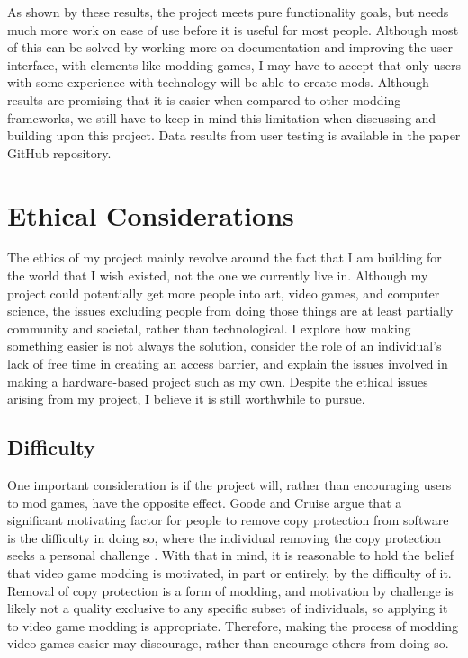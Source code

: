 \documentclass[10pt,twocolumn]{article}
\begin{document}
As shown by these results, the project meets pure functionality goals, but
needs much more work on ease of use before it is useful for most people.
Although most of this can be solved by working more on documentation and
improving the user interface, with elements like modding games, I may have
to accept that only users with some experience with technology will be able
to create mods. Although results are promising that it is easier when compared
to other modding frameworks, we still have to keep in mind this
limitation when discussing and building upon this project. Data results
from user testing is available in the paper GitHub repository.

\section{Ethical Considerations}

The ethics of my project mainly revolve around the fact that I am building
for the world that I wish existed, not the one we currently live in. Although my
project could potentially get more people into art, video games, and computer
science, the issues excluding people from doing those things are at least
partially community and societal, rather than technological.
I explore how making
something easier is not always the solution, consider the role of an
individual's lack of free time in creating an access barrier, and explain the
issues involved in making a hardware-based project such as my own. Despite the
ethical issues arising from my project, I believe it is still worthwhile to
pursue.

\subsection{Difficulty}

One important consideration is if the project will, rather than encouraging
users to mod games, have the opposite effect.
Goode and Cruise argue that a significant motivating factor for people to remove
copy protection from software is the difficulty in doing so, where the
individual removing the copy protection seeks a personal challenge
\cite{goode_what_2006}. With that in mind, it is reasonable to hold the belief
that video game modding is motivated, in part or entirely, by the
difficulty of it. Removal of copy protection is a form of modding, and
motivation by challenge is likely not a quality exclusive to any specific subset
of individuals, so applying it to video game modding is appropriate.
Therefore, making the process of modding video games easier may discourage,
rather than encourage others from doing so.
\end{document}
